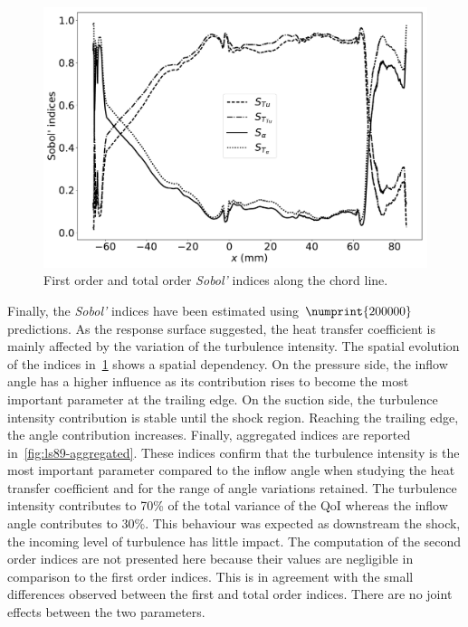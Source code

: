 \begin{figure}[ht]
\centering
\includegraphics[width=\linewidth]{fig/applications/ls89/14_2column_color-online-only_sensitivity_map.pdf}
\caption{First order and total order \textit{Sobol'} indices along the chord line.}
\label{fig:ls89-map}
\end{figure}

Finally, the \textit{Sobol'} indices have been estimated using $\numprint{200000}$ predictions. As the response surface suggested, the heat transfer coefficient is mainly affected by the variation of the turbulence intensity. The spatial evolution of the indices in~\cref{fig:ls89-map} shows a spatial dependency. On the pressure side, the inflow angle has a higher influence as its contribution rises to become the most important parameter at the trailing edge. On the suction side, the turbulence intensity contribution is stable until the shock region. Reaching the trailing edge, the angle contribution increases. Finally, aggregated indices are reported in~\cref{fig:ls89-aggregated}. These indices confirm that the turbulence intensity is the most important parameter compared to the inflow angle when studying the heat transfer coefficient and for the range of angle variations retained. The turbulence intensity contributes to 70\% of the total variance of the QoI whereas the inflow angle contributes to 30\%. This behaviour was expected as downstream the shock, the incoming level of turbulence has little impact. The computation of the second order indices are not presented here because their values are negligible in comparison to the first order indices. This is in agreement with the small differences observed between the first and total order indices. There are no joint effects between the two parameters.


